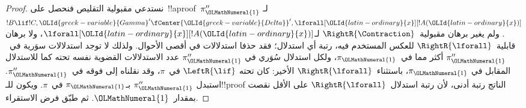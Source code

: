 \documentclass[../../../include/open-logic-section]{subfiles}
\begin{document}
\begin{proof}
نستدعي مقبولية التقليص فنحصل على~!!a{proof}~$\pi_{\OLMathNumeral{1}}''$ لـ
$!B \lif !C, {\OLId{greek-variable}{Gamma}}' \fCenter {\OLId{greek-variable}{Delta}}', \lforall[{\OLId{latin-ordinary}{x}}][!A({\OLId{latin-ordinary}{x}})]$. ولم
يغير برهان مقبولية~$\RightR{\Contraction}$ لـ$\lforall[{\OLId{latin-ordinary}{x}}][!A({\OLId{latin-ordinary}{x}})]$،
ولا برهان قابلية~$\RightR{\lforall}$ للعكس المستخدم فيه، رتبة أي
استدلال؛ فقد حذفا استدلالات في أقصى الأحوال. ولذلك لا توجد استدلالات
سوَرية في~$\pi_{\OLMathNumeral{1}}''$ أكثر مما في~$\pi_{\OLMathNumeral{1}}$، ولكل استدلال سُوَري في
$\pi_{\OLMathNumeral{1}}''$ عدد الاستدلالات القضوية نفسه تحته كما للاستدلال المقابل في
$\pi_{\OLMathNumeral{1}}$، باستثناء~$\RightR{\lforall}$ الأخير: كان تحته
$\LeftR{\lif}$ في~$\pi$، وقد نقلناه إلى فوقه في~$\pi_{\OLMathNumeral{1}}''$. استبدل
$\pi_{\OLMathNumeral{1}}''$ بـ$\pi_{\OLMathNumeral{1}}$ في~$\pi$. ويكون للـ!!{proof} الناتج رتبة أدنى،
لأن رتبة استدلال~$\RightR{\lforall}$ على الأقل نقصت بمقدار~${\OLMathNumeral{1}}$. ثم
طبّق فرض الاستقراء.


\end{proof}
\end{document}
